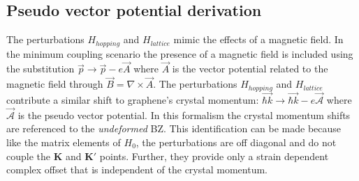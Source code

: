 \subsection{Pseudo vector potential derivation}
The perturbations $H_{hopping}$ and $H_{lattice}$ mimic the effects of a magnetic field.
In the minimum coupling scenario the presence of a magnetic field is included using the substitution $\vec{p} \rightarrow \vec{p} - e \vec{A}$ where $\vec{A}$ is the vector potential related to the magnetic field through $\vec{B}=\nabla \times \vec{A}$.
The perturbations $H_{hopping}$ and $H_{lattice}$ contribute a similar shift to graphene's crystal momentum: $\vec{\hbar k} \rightarrow \vec{\hbar k} - e \vec{\mathcal{A}}$ where $\vec{\mathcal{A}}$ is the pseudo vector potential.
In this formalism the crystal momentum shifts are referenced to the \emph{undeformed} BZ.
This identification can be made because like the matrix elements of $H_0$, the perturbations are off diagonal and do not couple the $\bm{K}$ and $\bm{K'}$ points.
Further, they provide only a strain dependent complex offset that is independent of the crystal momentum.


